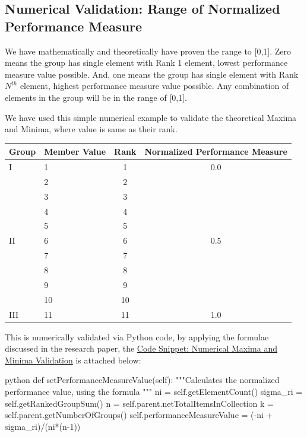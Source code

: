 \documentclass[a4paper,fleqn,review]{cas-sc}
\begin{document}
\subsection{Numerical Validation: Range of Normalized Performance Measure}
We have mathematically and theoretically have proven the range to [0,1].
Zero means the group has single element with Rank 1 element, lowest performance measure value possible.
And, one means the group has single element with Rank $N^{th}$ element, highest performance measure value possible.
Any combination of elements in the group will be in the range of [0,1].

We have used this simple numerical example to validate the theoretical Maxima and Minima, where value is same as their rank.
\begin{center}
	\begin{tabular}{llcc}
		\toprule
		\textbf{Group} & \textbf{Member Value} & \textbf{Rank} & \textbf{Normalized Performance Measure} \\
		\midrule
		I     & 1   & 1   & 0.0 \\
		\midrule
		\multirow{9}{*}{II} 
		& 2   & 2   & \multirow{9}{*}{0.5} \\
		& 3   & 3   &  \\
		& 4   & 4   &  \\
		& 5   & 5   &  \\
		& 6   & 6   &  \\
		& 7   & 7   &  \\
		& 8   & 8   &  \\
		& 9   & 9   &  \\
		& 10  & 10  &  \\
		\midrule
		III   & 11  & 11  & 1.0 \\
		\bottomrule
	\end{tabular}
	\label{table:validation}
\end{center}


This is numerically validated via Python code, by applying the formulae discussed in the research paper, the \hyperref[code:numerical-validation-minima-maxima]{Code Snippet: Numerical Maxima and Minima Validation} is attached below:
\begin{mintedbox}{python}
	def setPerformanceMeasureValue(self):
	"""Calculates the normalized performance value, using the formula
	"""
	ni = self.getElementCount()
	sigma_ri = self.getRankedGroupSum()
	n = self.parent.netTotalItemsInCollection
	k = self.parent.getNumberOfGroups()
	self.performanceMeasureValue = (-ni + sigma_ri)/(ni*(n-1))
\end{mintedbox}
\label{code:numerical-validation-minima-maxima}
\end{document}
